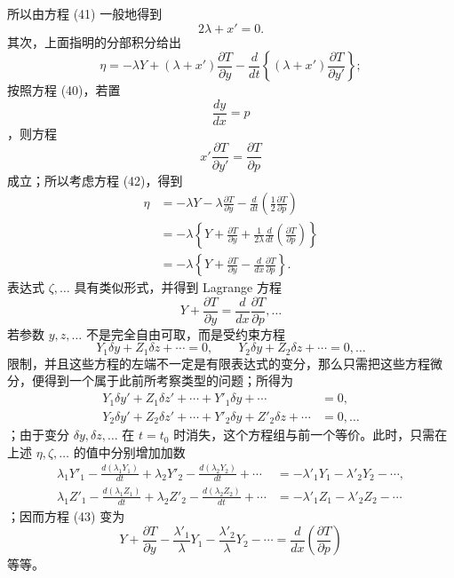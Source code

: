 \documentclass[11pt,a4paper,leqno]{article}
\begin{document}
所以由方程 (41) 一般地得到
\begin{equation}\tag{42}
2\lambda+x'=0.
\end{equation}
其次，上面指明的分部积分给出
\[
\eta=-\lambda Y+(\lambda+x')\frac{\partial T}{\partial y}
-\frac{d}{dt}\left\{(\lambda+x')\frac{\partial T}{\partial y'}\right\};
\]
按照方程 (40)，若置
\[
\frac{dy}{dx}=p
\]
，则方程
\[
x'\frac{\partial T}{\partial y'}=\frac{\partial T}{\partial p}
\]
成立；所以考虑方程 (42)，得到
\[
\begin{aligned}
\eta&=-\lambda Y-\lambda\frac{\partial T}{\partial y}
-\frac{d}{dt}\left(\frac12\frac{\partial T}{\partial p}\right)\\
&=-\lambda\left\{Y+\frac{\partial T}{\partial y}
+\frac{1}{2\lambda}\frac{d}{dt}\left(\frac{\partial T}{\partial p}\right)\right\}\\
&=-\lambda\left\{Y+\frac{\partial T}{\partial y}
-\frac{d}{dx}\frac{\partial T}{\partial p}\right\}.
\end{aligned}
\]
\newpage
表达式 $\zeta,\ldots$ 具有类似形式，并得到 Lagrange 方程
\begin{equation}\tag{43}
Y+\frac{\partial T}{\partial y}=\frac{d}{dx}\frac{\partial T}{\partial p},\ldots
\end{equation}
若参数 $y,z,\ldots$ 不是完全自由可取，而是受约束方程
\[
Y_1\delta y+Z_1\delta z+\cdots=0,\qquad
Y_2\delta y+Z_2\delta z+\cdots=0,\ldots
\]
限制，并且这些方程的左端不一定是有限表达式的变分，那么只需把这些方程微分，便得到一个属于此前所考察类型的问题；所得为
\[
\begin{aligned}
Y_1\delta y'+Z_1\delta z'+\cdots+Y'_1\delta y+\cdots&=0,\\
Y_2\delta y'+Z_2\delta z'+\cdots+Y'_2\delta y+Z'_2\delta z+\cdots&=0,\ldots
\end{aligned}
\]
；由于变分 $\delta y,\delta z,\ldots$ 在 $t=t_0$ 时消失，这个方程组与前一个等价。此时，只需在上述 $\eta,\zeta,\ldots$ 的值中分别增加加数
\[
\begin{aligned}
\lambda_1Y'_1-\frac{d(\lambda_1Y_1)}{dt}
+\lambda_2Y'_2-\frac{d(\lambda_2Y_2)}{dt}+\cdots
&=-\lambda'_1Y_1-\lambda'_2Y_2-\cdots,\\
\lambda_1Z'_1-\frac{d(\lambda_1Z_1)}{dt}
+\lambda_2Z'_2-\frac{d(\lambda_2Z_2)}{dt}+\cdots
&=-\lambda'_1Z_1-\lambda'_2Z_2-\cdots
\end{aligned}
\]
；因而方程 (43) 变为
\[
Y+\frac{\partial T}{\partial y}
-\frac{\lambda'_1}{\lambda}Y_1
-\frac{\lambda'_2}{\lambda}Y_2-\cdots
=\frac{d}{dx}\left(\frac{\partial T}{\partial p}\right)
\]
等等。
\end{document}
